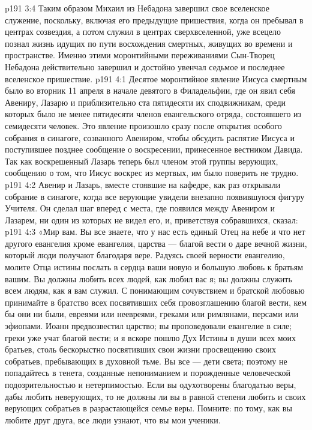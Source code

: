 \vs p191 3:4 Таким образом Михаил из Небадона завершил свое вселенское служение, поскольку, включая его предыдущие пришествия, когда он пребывал в центрах созвездия, а потом служил в центрах сверхвселенной, уже всецело познал жизнь идущих по пути восхождения смертных, живущих во времени и пространстве. Именно этими моронтийными переживаниями Сын\hyp{}Творец Небадона действительно завершил и достойно увенчал седьмое и последнее вселенское пришествие.
\vs p191 4:1 Десятое моронтийное явление Иисуса смертным было во вторник 11 апреля в начале девятого в Филадельфии, где он явил себя Авениру, Лазарю и приблизительно ста пятидесяти их сподвижникам, среди которых было не менее пятидесяти членов евангельского отряда, состоявшего из семидесяти человек. Это явление произошло сразу после открытия особого собрания в синагоге, созванного Авениром, чтобы обсудить распятие Иисуса и поступившее позднее сообщение о воскресении, принесенное вестником Давида. Так как воскрешенный Лазарь теперь был членом этой группы верующих, сообщению о том, что Иисус воскрес из мертвых, им было поверить не трудно.
\vs p191 4:2 Авенир и Лазарь, вместе стоявшие на кафедре, как раз открывали собрание в синагоге, когда все верующие увидели внезапно появившуюся фигуру Учителя. Он сделал шаг вперед с места, где появился между Авениром и Лазарем, ни один из которых не видел его, и, приветствуя собравшихся, сказал:
\vs p191 4:3 \pc «Мир вам. Вы все знаете, что у нас есть единый Отец на небе и что нет другого евангелия кроме евангелия, царства --- благой вести о даре вечной жизни, который люди получают благодаря вере. Радуясь своей верности евангелию, молите Отца истины послать в сердца ваши новую и большую любовь к братьям вашим. Вы должны любить всех людей, как любил вас я; вы должны служить всем людям, как я вам служил. С понимающим сочувствием и братской любовью принимайте в братство всех посвятивших себя провозглашению благой вести, кем бы они ни были, евреями или неевреями, греками или римлянами, персами или эфиопами. Иоанн предвозвестил царство; вы проповедовали евангелие в силе; греки уже учат благой вести; и я вскоре пошлю Дух Истины в души всех моих братьев, столь бескорыстно посвятивших свои жизни просвещению своих собратьев, пребывающих в духовной тьме. Вы все --- дети света; поэтому не попадайтесь в тенета, созданные непониманием и порожденные человеческой подозрительностью и нетерпимостью. Если вы одухотворены благодатью веры, дабы любить неверующих, то не должны ли вы в равной степени любить и своих верующих собратьев в разрастающейся семье веры. Помните: по тому, как вы любите друг друга, все люди узнают, что вы мои ученики.
